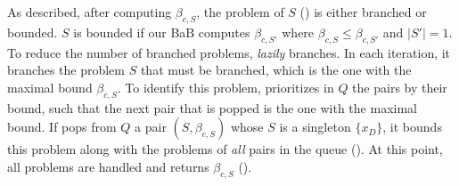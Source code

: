 As described, after computing $\beta_{c,S}$, the problem of $S$ () is either branched or bounded.  
$S$ is bounded if our BaB computes $\beta_{c,S'}$ where $\beta_{c,S}\leq \beta_{c,S'}$ and $|S'|=1$. 
To reduce the number of branched problems, %
 \boundtool \emph{lazily} branches. In each iteration, it branches the problem $S$ that must be branched, which is the one with the maximal bound $\beta_{c,S}$.  
To identify this problem, \boundtool prioritizes in $Q$ the pairs by their bound, such that the next pair that is popped is the one with the maximal bound. 
%
If \boundtool pops from $Q$ a pair $(S,\beta_{c,S})$ whose $S$ is a singleton $\{x_D\}$, it bounds this problem along with the problems of \emph{all} pairs in the queue (). At this point, all problems are handled and \boundtool returns $\beta_{c,S}$ (). 
%

